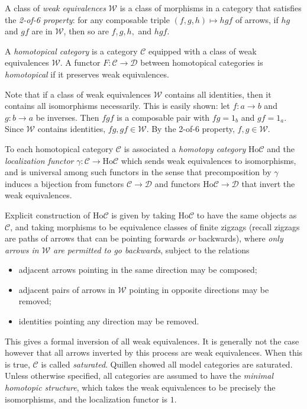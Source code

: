 \begin{definition}\label{dfn:10.3}
	A class of \emph{weak equivalences} $\mathcal{W} $ is a class of morphisms in a category that satisfies the \emph{2-of-6 property}: for any composable triple $(f,g,h)\mapsto hgf$ of arrows, if $hg$ and $gf$ are in $\mathcal{W} $, then so are $f,g,h,$ and $hgf$.

	A \emph{homotopical category} is a category $\mathcal{C} $ equipped with a class of weak equivalences $\mathcal{W} $. A functor $F : \mathcal{C}  \to \mathcal{D} $ between homotopical categories is \emph{homotopical} if it preserves weak equivalences.
\end{definition}

Note that if a class of weak equivalences $\mathcal{W} $ contains all identities, then it contains all isomorphisms necessarily. This is easily shown: let $f : a \to b$ and $g : b \to a$ be inverses. Then $fgf$ is a composable pair with $fg=1_b$ and $gf=1_a$. Since $\mathcal{W} $ contains identities, $fg,gf\in \mathcal{W} $. By the 2-of-6 property, $f,g\in \mathcal{W} $.

To each homotopical category $\mathcal{C} $ is associated a \emph{homotopy category} $\mathrm{Ho} \mathcal{C} $ and the \emph{localization functor} $\gamma : \mathcal{C}  \to \mathrm{Ho} \mathcal{C} $ which sends weak equivalences to isomorphisms, and is universal among such functors in the sense that precomposition by $\gamma$ induces a bijection from functors $\mathcal{C} \to \mathcal{D} $ and functors $\mathrm{Ho} \mathcal{C} \to \mathcal{D} $ that invert the weak equivalences.

Explicit construction of $\mathrm{Ho} \mathcal{C} $ is given by taking $\mathrm{Ho} \mathcal{C} $ to have the same objects as $\mathcal{C} $, and taking morphisms to be equivalence classes of finite zigzags (recall zigzags are paths of arrows that can be pointing forwards \emph{or} backwards), where \emph{only arrows in $\mathcal{W} $ are permitted to go backwards}, subject to the relations
\begin{itemize}
	\item adjacent arrows pointing in the same direction may be composed;
	\item adjacent pairs of arrows in $\mathcal{W} $ pointing in opposite directions may be removed;
	\item identities pointing any direction may be removed.
\end{itemize}
This gives a formal inversion of all weak equivalences. It is generally not the case however that all arrows inverted by this process are weak equivalences. When this is true, $\mathcal{C} $ is called \emph{saturated}. Quillen showed all model categories are saturated. Unless otherwise specified, all categories are assumed to have the \emph{minimal homotopic structure}, which takes the weak equivalences to be precisely the isomorphisms, and the localization functor is $1$.

